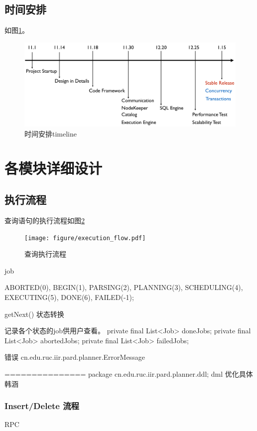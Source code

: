 \documentclass[a4paper, 12pt]{ctexart}
\begin{document}
\subsection{时间安排}
如图\ref{fig:tl}。

\begin{figure}[htbp]
	\centering
	\includegraphics[width=\linewidth]{figure/timeline.png}
	\caption{时间安排timeline}
	\label{fig:tl}
\end{figure}

\section{各模块详细设计}
\subsection{执行流程}
查询语句的执行流程如图\ref{fig:ef}

\begin{figure}[htbp]
	\centering
	\texttt{[image: figure/execution\_flow.pdf]}
	\caption{查询执行流程}
	\label{fig:ef}
\end{figure}

job 

ABORTED(0), BEGIN(1), PARSING(2), PLANNING(3), SCHEDULING(4), EXECUTING(5), DONE(6), FAILED(-1);


getNext() 状态转换



记录各个状态的job供用户查看。
private final List<Job> doneJobs;
private final List<Job> abortedJobs;
private final List<Job> failedJobs;


错误
cn.edu.ruc.iir.pard.planner.ErrorMessage



=============== 
package cn.edu.ruc.iir.pard.planner.ddl;
dml  优化具体 韩涵

\subsubsection{Insert/Delete 流程}
RPC
\end{document}
